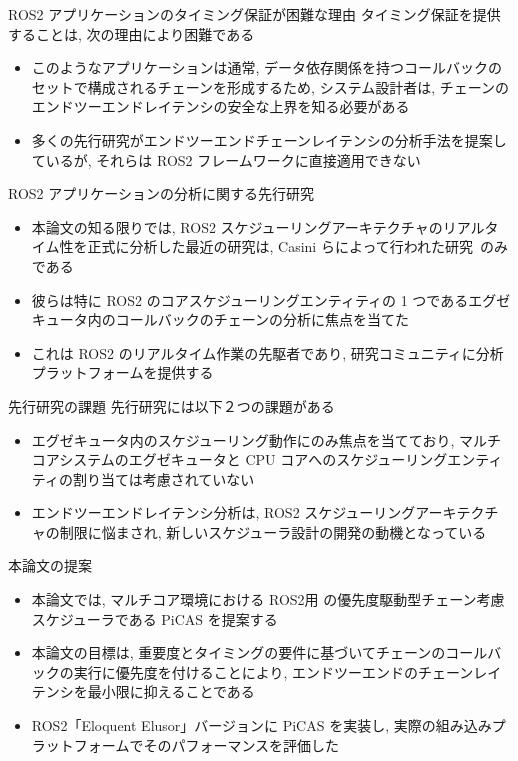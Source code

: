 \begin{frame}{ROS2 アプリケーションのタイミング保証が困難な理由}
    タイミング保証を提供することは, 次の理由により困難である
    \begin{itemize}
        \item このようなアプリケーションは通常, データ依存関係を持つコールバックのセットで構成されるチェーンを形成するため, システム設計者は, チェーンのエンドツーエンドレイテンシの安全な上界を知る必要がある
        \item 多くの先行研究がエンドツーエンドチェーンレイテンシの分析手法を提案しているが, それらは ROS2 フレームワークに直接適用できない
    \end{itemize}
\end{frame}

\begin{frame}{ROS2 アプリケーションの分析に関する先行研究}
    \begin{itemize}
        \item 本論文の知る限りでは, ROS2 スケジューリングアーキテクチャのリアルタイム性を正式に分析した最近の研究は, Casini らによって行われた研究~\cite{casini2019response}のみである
        \item 彼らは特に ROS2 のコアスケジューリングエンティティの 1 つであるエグゼキュータ内のコールバックのチェーンの分析に焦点を当てた
        \item これは ROS2 のリアルタイム作業の先駆者であり, 研究コミュニティに分析プラットフォームを提供する
    \end{itemize}
\end{frame}

\begin{frame}{先行研究の課題}
    先行研究には以下２つの課題がある
    \begin{itemize}
        \item エグゼキュータ内のスケジューリング動作にのみ焦点を当てており, マルチコアシステムのエグゼキュータと CPU コアへのスケジューリングエンティティの割り当ては考慮されていない
        \item エンドツーエンドレイテンシ分析は, ROS2 スケジューリングアーキテクチャの制限に悩まされ, 新しいスケジューラ設計の開発の動機となっている
    \end{itemize}
\end{frame}

\begin{frame}{本論文の提案}
    \begin{itemize}
        \item 本論文では, マルチコア環境における ROS2用 の優先度駆動型チェーン考慮スケジューラである PiCAS を提案する
        \item 本論文の目標は, 重要度とタイミングの要件に基づいてチェーンのコールバックの実行に優先度を付けることにより, エンドツーエンドのチェーンレイテンシを最小限に抑えることである
        \item ROS2「Eloquent Elusor」バージョンに PiCAS を実装し, 実際の組み込みプラットフォームでそのパフォーマンスを評価した
    \end{itemize}
\end{frame}

